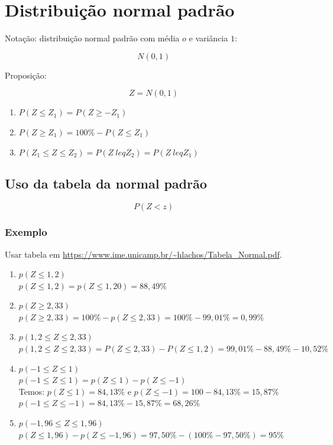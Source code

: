 \documentclass[a4paper]{article}
\begin{document}
	\section{Distribuição normal padrão}
	
	Notação: distribuição normal padrão com média $o$ e variância $1$:
	
	\begin{equation*}
		N(0,1)
	\end{equation*}
	
	Proposição:
	
	\begin{equation*}
	Z = N(0,1)
	\end{equation*}
	
	\begin{enumerate}
		\item $P(Z \leq Z_1) = P(Z \geq -Z_1)$
		\item $P(Z \geq Z_1) = 100\% - P(Z \leq Z_1)$
		\item $P(Z_1 \leq Z \leq Z_2) = P(Z \ leq Z_2) = P(Z \ leq Z_1)$
	\end{enumerate}
	
	\subsection{Uso da tabela da normal padrão}
	
	\begin{equation*}
		P(Z < z)
	\end{equation*}
	
	\subsubsection{Exemplo}
	
	Usar tabela em \url{https://www.ime.unicamp.br/~hlachos/Tabela_Normal.pdf}.
	
	\begin{enumerate}[label=\alph*.]
		\item $p(Z \leq 1,2)$ \\
		$p(Z \leq 1,2) = p(Z \leq 1,20) = 88,49\%$
		\item $p(Z \geq 2,33)$ \\ $p(Z \geq 2,33) = 100\% - p(Z \leq 2,33) = 100\% - 99,01\% = 0,99\%$
		\item $p(1,2 \leq Z \leq 2,33)$ \\
		$p(1,2 \leq Z \leq 2,33) = P(Z \leq 2,33) - P(Z \leq 1,2) = 99,01\% - 88,49\% - 10,52\%$
		\item $p(-1 \leq Z \leq 1)$ \\
		$p(-1 \leq Z \leq 1) = p(Z \leq 1) - p(Z \leq -1)$ \\
		Temos: $p(Z \leq 1) = 84,13\%$ e $p(Z \leq -1) = 100-84,13\% = 15,87\%$ \\
		$p(-1 \leq Z \leq -1) = 84,13\% - 15,87\% = 68,26\%$
		\item $p(-1,96 \leq Z \leq 1,96)$ \\
		$p(Z \leq 1,96) - p(Z \leq -1,96) = 97,50\% - (100\% - 97,50\%) = 95\%$
	\end{enumerate}
\end{document}
